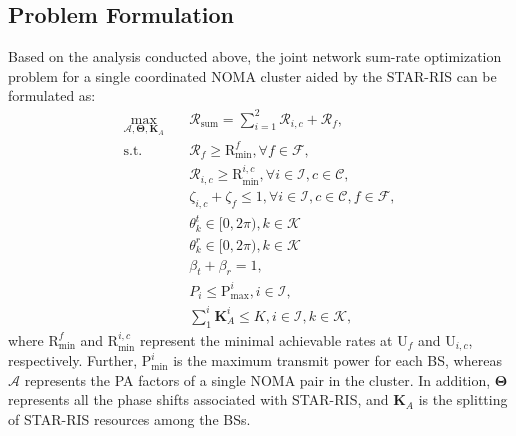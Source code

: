 \documentclass[conference]{IEEEtran}
\begin{document}
\subsection{Problem Formulation}
Based on the analysis conducted above, the joint network sum-rate optimization problem for a single coordinated NOMA cluster aided by the STAR-RIS can be formulated as:
\begin{align}
    \max_{\mathbf{\mathcal{A}}, \mathbf{\Theta}, \textbf{K}_A} \quad & \mathcal{R}_{\text{sum}}=\sum_{i=1}^{2} \mathcal{R}_{i,c} + \mathcal{R}_{f}, \label{eq:opt}             \\
    \textrm{s.t.} \quad                                              & \mathcal{R}_f\geq\text{R}_\text{min}^f, \forall f \in \mathcal{F}, \nonumber                            \\
    \quad                                                            & \mathcal{R}_{i,c}\geq\text{R}_\text{min}^{i,c}, \forall i \in \mathcal{I}, c \in \mathcal{C}, \nonumber \\
    \quad                                                            & \zeta_{i,c} + \zeta_f\leq1, \forall i \in \mathcal{I}, c \in \mathcal{C}, f \in \mathcal{F}, \nonumber  \\
    \quad                                                            & \theta_k^t\in[0, 2\pi), k \in \mathcal{K} \nonumber                                                     \\
    \quad                                                            & \theta_k^r\in[0, 2\pi), k \in \mathcal{K} \nonumber                                                     \\
    \quad                                                            & \beta_t + \beta_r = 1, \nonumber                                                                        \\
    \quad                                                            & P_i \leq \text{P}_\text{max}^i, i \in \mathcal{I}, \nonumber                                            \\
    \quad                                                            & \sum_1^i \textbf{K}_A^i \leq K, i \in \mathcal{I}, k \in \mathcal{K}, \nonumber
\end{align}
where $\text{R}_\text{min}^f$ and $\text{R}_\text{min}^{i,c}$ represent the minimal achievable rates at U$_f$ and U$_{i,c}$, respectively. Further, $\text{P}_\text{min}^i$ is the maximum transmit power for each BS, whereas $\mathbf{\mathcal{A}}$ represents the PA factors of a single NOMA pair in the cluster. In addition, $\mathbf{\Theta}$ represents all the phase shifts associated with STAR-RIS, and $\textbf{K}_A$ is the splitting of STAR-RIS resources among the BSs.
\end{document}
